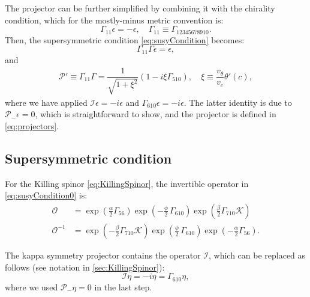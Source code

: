 The projector can be further simplified by combining it with the chirality condition, which for the mostly-minus metric convention is: 
\begin{equation}
 \Gamma_{11} \epsilon = -\epsilon, \quad 
 \Gamma_{11} \equiv \Gamma_{12345678910}.
\end{equation}
Then, the supersymmetric condition \eqref{eq:susyCondition} becomes:
\begin{equation}
 \Gamma_{11} \Gamma \epsilon = \epsilon,
\end{equation}
and 
\begin{align} \label{eq:newProjector}
  \mathcal{P}' \equiv \Gamma_{11} \Gamma  = \dfrac{1}{\sqrt{1+\xi^2}}(1- i \xi  \Gamma_{510}), \quad 
   \xi \equiv  \dfrac{v_\theta}{v_c} \theta'(c),
\end{align}
where we have applied $\mathcal{I} \epsilon = -i\epsilon$ and $\Gamma_{610} \epsilon = -i \epsilon$. The latter identity is due to $\mathcal{P}_- \epsilon = 0$, which is straightforward to show, and the projector is defined in \eqref{eq:projectors}.


\subsection{Supersymmetric condition}

For the Killing spinor \eqref{eq:KillingSpinor}, the invertible operator in \eqref{eq:susyCondition0} is:
\begin{align}
 \mathcal{O} &= \exp{\left(\frac{\alpha}{2}\Gamma_{56} \right)} \exp{\left(-\frac{\phi}{2}\, \Gamma_{610} \right)} \exp{\left(\frac{\beta}{2}\Gamma_{710} \mathcal{K} \right)} \\
 \mathcal{O}^{-1} &=  \exp{\left(-\frac{\beta}{2}\Gamma_{710} \mathcal{K} \right)} 
 \exp{\left(\frac{\phi}{2}\, \Gamma_{610} \right)} 
 \exp{\left(-\frac{\alpha}{2}\Gamma_{56} \right)}.
\end{align}


The kappa symmetry projector contains the operator $\mathcal{I}$, which can be replaced as follows (see notation in \ref{sec:KillingSpinor}):
\begin{equation}
 \mathcal{I}\eta =-i \eta = \Gamma_{610} \eta,
\end{equation}
where we used $\mathcal{P}_- \eta =0$ in the last step. 

